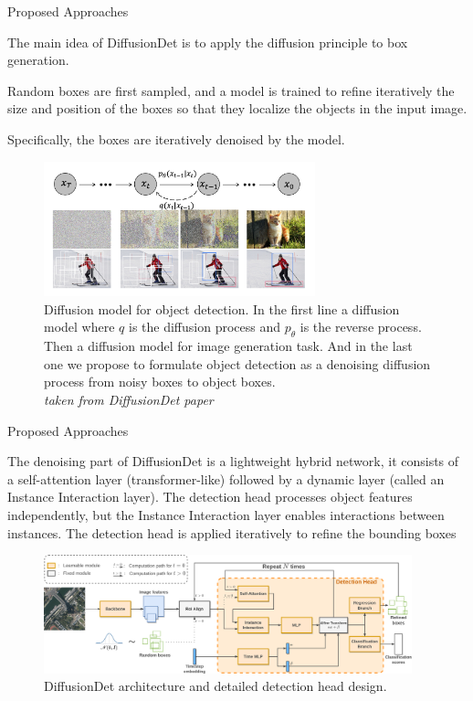 \begin{subsectionframemod}{Proposed Approaches}

    The main idea of DiffusionDet is to apply the diffusion principle to box generation.

    Random boxes are first sampled, and a model is trained to refine iteratively the size and position of the boxes so that they localize the objects in the input image.

    Specifically, the boxes are iteratively \alert{denoised} by the model.



    \begin{figure}
        \includegraphics[width=0.70\textwidth]{Figures/teaser_diffusion}
        \caption{
        Diffusion model for object detection.
            In the first line a diffusion model where $q$ is the diffusion process and $p_{\theta}$ is the reverse process.
            Then a diffusion model for image generation task.
            And in the last one we propose to formulate object detection as a denoising diffusion process from noisy boxes to object boxes.\\
            \small{\textit{taken from DiffusionDet paper \cite{chen2022diffusiondet}}}
        }\label{fig:diffusion}
    \end{figure}

\end{subsectionframemod}

\begin{subsectionframemod}{Proposed Approaches}

    The denoising part of DiffusionDet is a lightweight hybrid network, it consists of a self-attention layer (transformer-like) followed by a dynamic layer (called an Instance Interaction layer).
    The detection head processes object features independently, but the Instance Interaction layer enables interactions between instances.
    The detection head is applied iteratively to refine the bounding boxes

    \begin{figure}
        \includegraphics[width=0.95\textwidth]{Figures/DiffusionDet}
        \caption{DiffusionDet architecture and detailed detection head design.}\label{fig:diffusiondet}
    \end{figure}

\end{subsectionframemod}